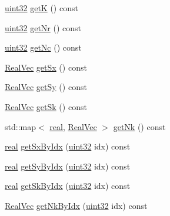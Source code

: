 \begin{DoxyCompactItemize}
\mbox{\hyperlink{typedefs_8cpp_a8ad23e2333787a214e20a58a284a5a60}{uint32}} \mbox{\hyperlink{classvd_ae145808dbbebfc984811eb48a6a57585}{getK}} () const
\item 
\mbox{\hyperlink{typedefs_8cpp_a8ad23e2333787a214e20a58a284a5a60}{uint32}} \mbox{\hyperlink{classvd_afda5d6b3eb04899e1b31c5ee3a3af527}{get\+Nr}} () const
\item 
\mbox{\hyperlink{typedefs_8cpp_a8ad23e2333787a214e20a58a284a5a60}{uint32}} \mbox{\hyperlink{classvd_a555fdcee74959a18003dd992a4c57cef}{get\+Nc}} () const
\item 
\mbox{\hyperlink{typedefs_8cpp_a84b6d9a0fbb45e01ad4a3aa5667f2992}{Real\+Vec}} \mbox{\hyperlink{classvd_a309203fb398a885176ae985a8906e886}{get\+Sx}} () const
\item 
\mbox{\hyperlink{typedefs_8cpp_a84b6d9a0fbb45e01ad4a3aa5667f2992}{Real\+Vec}} \mbox{\hyperlink{classvd_a704c56db9a9782e1c82d3d199ddfd699}{get\+Sy}} () const
\item 
\mbox{\hyperlink{typedefs_8cpp_a84b6d9a0fbb45e01ad4a3aa5667f2992}{Real\+Vec}} \mbox{\hyperlink{classvd_adf9f15df018d2ceff5f68bdf7bd6f613}{get\+Sk}} () const
\item 
std\+::map$<$ \mbox{\hyperlink{typedefs_8cpp_a58a0c7cf2501f4492da833421be92547}{real}}, \mbox{\hyperlink{typedefs_8cpp_a84b6d9a0fbb45e01ad4a3aa5667f2992}{Real\+Vec}} $>$ \mbox{\hyperlink{classvd_a90613fc46f246a5450e26487caff33f9}{get\+Nk}} () const
\item 
\mbox{\hyperlink{typedefs_8cpp_a58a0c7cf2501f4492da833421be92547}{real}} \mbox{\hyperlink{classvd_a960d4b8fbedb7cbb0686ad42e19d6396}{get\+Sx\+By\+Idx}} (\mbox{\hyperlink{typedefs_8cpp_a8ad23e2333787a214e20a58a284a5a60}{uint32}} idx) const
\item 
\mbox{\hyperlink{typedefs_8cpp_a58a0c7cf2501f4492da833421be92547}{real}} \mbox{\hyperlink{classvd_a0f630fc80e57d3e17ab036f75afde006}{get\+Sy\+By\+Idx}} (\mbox{\hyperlink{typedefs_8cpp_a8ad23e2333787a214e20a58a284a5a60}{uint32}} idx) const
\item 
\mbox{\hyperlink{typedefs_8cpp_a58a0c7cf2501f4492da833421be92547}{real}} \mbox{\hyperlink{classvd_a4d2c835e7804c4242dce6d411f01ce0a}{get\+Sk\+By\+Idx}} (\mbox{\hyperlink{typedefs_8cpp_a8ad23e2333787a214e20a58a284a5a60}{uint32}} idx) const
\item 
\mbox{\hyperlink{typedefs_8cpp_a84b6d9a0fbb45e01ad4a3aa5667f2992}{Real\+Vec}} \mbox{\hyperlink{classvd_a4d058d2d1d675a741a83776c95b2acfb}{get\+Nk\+By\+Idx}} (\mbox{\hyperlink{typedefs_8cpp_a8ad23e2333787a214e20a58a284a5a60}{uint32}} idx) const

\end{DoxyCompactItemize}
